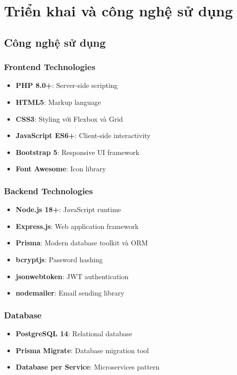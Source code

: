 \documentclass[12pt,a4paper]{report}
\begin{document}
\chapter{Triển khai và công nghệ sử dụng}

\section{Công nghệ sử dụng}

\subsection{Frontend Technologies}
\begin{itemize}
    \item \textbf{PHP 8.0+}: Server-side scripting
    \item \textbf{HTML5}: Markup language
    \item \textbf{CSS3}: Styling với Flexbox và Grid
    \item \textbf{JavaScript ES6+}: Client-side interactivity
    \item \textbf{Bootstrap 5}: Responsive UI framework
    \item \textbf{Font Awesome}: Icon library
\end{itemize}

\subsection{Backend Technologies}
\begin{itemize}
    \item \textbf{Node.js 18+}: JavaScript runtime
    \item \textbf{Express.js}: Web application framework
    \item \textbf{Prisma}: Modern database toolkit và ORM
    \item \textbf{bcryptjs}: Password hashing
    \item \textbf{jsonwebtoken}: JWT authentication
    \item \textbf{nodemailer}: Email sending library
\end{itemize}

\subsection{Database}
\begin{itemize}
    \item \textbf{PostgreSQL 14}: Relational database
    \item \textbf{Prisma Migrate}: Database migration tool
    \item \textbf{Database per Service}: Microservices pattern
\end{itemize}
\end{document}
